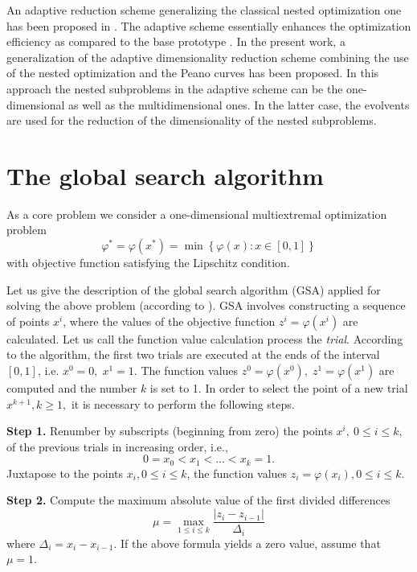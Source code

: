\documentclass[runningheads]{llncs}
\begin{document}
An adaptive reduction scheme generalizing the classical nested optimization one has been proposed in 
\cite{Grishagin2016}. The adaptive scheme essentially enhances the optimization efficiency as compared to the base 
prototype \cite{Grishagin2016_1}. In the present work, a generalization of the adaptive dimensionality reduction scheme 
combining the use of the nested optimization and the Peano curves has been proposed. In this approach the nested 
subproblems in the adaptive scheme can be the one-dimensional as well as the multidimensional ones. In the latter case, 
the evolvents are used for the reduction of the dimensionality of the nested subproblems.


\section{The global search algorithm}
\label{SectionCore}

As a core problem we consider a one-dimensional multiextremal optimization 
problem
\begin{equation}\label{uni_problem}
\varphi^\ast = \varphi(x^\ast)=\min{\left\{\varphi(x):x\in \left[0,1\right] 
\right\}}
\end{equation}
with objective function satisfying the Lipschitz condition. 

Let us give the description of the global search algorithm (GSA) applied for 
solving the above problem (according to \cite{Strongin2000}). 
GSA involves constructing a sequence of points $x^i$, where the values of the 
objective function $z^i=\varphi(x^i)$ are calculated. Let us call the 
function value calculation process the \textit{trial}. 
According to the algorithm, the first two trials are executed at the ends of 
the interval  $[0,1]$, i.e. $x^0=0,\;x^1=1$. The function values $z^0=\varphi
(x^0),\;z^1=\varphi(x^1)$  are computed and the number $k$ is set to 1. In 
order to select the point of a new trial $x^{k+1}, k\geq 1,$  it is necessary 
to perform the following steps.

\textbf{Step 1.} Renumber by subscripts (beginning from zero) the points $x^i,
\:0\leq i\leq k$, of the previous trials in increasing order, i.e.,
\[
0=x_0<x_1<\ldots <x_{k}=1.
\] 
Juxtapose to the points $x_i, 0\leq i\leq k$,  the function values $z_i=
\varphi(x_i), 0\leq i\leq k$.

\textbf{Step 2.} Compute the maximum absolute value of the first divided 
differences 
\begin{equation}\label{mu}
\mu=\max_{1\leq i\leq k}\frac{\left|z_i-z_{i-1}\right|}{\Delta_i}
\end{equation}
where $\Delta_i = x_i-x_{i-1}$. If the above formula yields a zero value, 
assume that $\mu = 1$.
\end{document}
